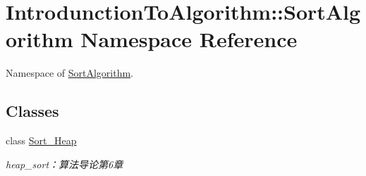 \hypertarget{namespace_introdunction_to_algorithm_1_1_sort_algorithm}{}\section{Introdunction\+To\+Algorithm\+:\+:Sort\+Algorithm Namespace Reference}
\label{namespace_introdunction_to_algorithm_1_1_sort_algorithm}


Namespace of \hyperlink{namespace_introdunction_to_algorithm_1_1_sort_algorithm}{Sort\+Algorithm}.  


\subsection*{Classes}
\begin{DoxyCompactItemize}
\item 
class \hyperlink{class_introdunction_to_algorithm_1_1_sort_algorithm_1_1_sort___heap}{Sort\+\_\+\+Heap}
\begin{DoxyCompactList}\small\item\em heap\+\_\+sort：算法导论第6章 \end{DoxyCompactList}\end{DoxyCompactItemize}
